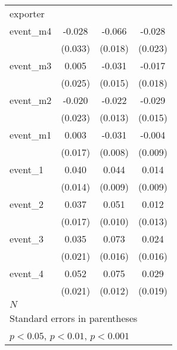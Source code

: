 {\begin{tabular}{l*{3}{c}}
\hline
exporter    &                     &                     &                     \\
event\_m4    &      -0.028         &      -0.066\sym{***}&      -0.028         \\
            &     (0.033)         &     (0.018)         &     (0.023)         \\
[1em]
event\_m3    &       0.005         &      -0.031\sym{*}  &      -0.017         \\
            &     (0.025)         &     (0.015)         &     (0.018)         \\
[1em]
event\_m2    &      -0.020         &      -0.022         &      -0.029         \\
            &     (0.023)         &     (0.013)         &     (0.015)         \\
[1em]
event\_m1    &       0.003         &      -0.031\sym{***}&      -0.004         \\
            &     (0.017)         &     (0.008)         &     (0.009)         \\
[1em]
event\_1     &       0.040\sym{**} &       0.044\sym{***}&       0.014         \\
            &     (0.014)         &     (0.009)         &     (0.009)         \\
[1em]
event\_2     &       0.037\sym{*}  &       0.051\sym{***}&       0.012         \\
            &     (0.017)         &     (0.010)         &     (0.013)         \\
[1em]
event\_3     &       0.035         &       0.073\sym{***}&       0.024         \\
            &     (0.021)         &     (0.016)         &     (0.016)         \\
[1em]
event\_4     &       0.052\sym{*}  &       0.075\sym{***}&       0.029         \\
            &     (0.021)         &     (0.012)         &     (0.019)         \\
\hline
\(N\)       &                     &                     &                     \\
\hline\hline
\multicolumn{4}{l}{\footnotesize Standard errors in parentheses}\\
\multicolumn{4}{l}{\footnotesize \sym{*} \(p<0.05\), \sym{**} \(p<0.01\), \sym{***} \(p<0.001\)}\\
\end{tabular}
}
